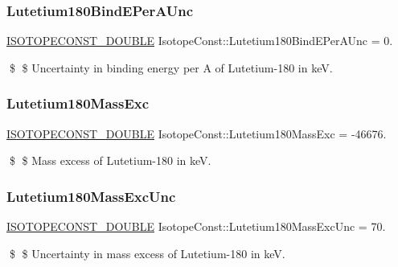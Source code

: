 \subsubsection{\texorpdfstring{Lutetium180\+Bind\+E\+Per\+A\+Unc}{Lutetium180BindEPerAUnc}}
{\footnotesize\ttfamily \mbox{\hyperlink{group___isotope_const-_macros_ga8f45a7272ce02c0b4c65c44636ed719a}{I\+S\+O\+T\+O\+P\+E\+C\+O\+N\+S\+T\+\_\+\+D\+O\+U\+B\+LE}} Isotope\+Const\+::\+Lutetium180\+Bind\+E\+Per\+A\+Unc = 0.}

\$ \$ Uncertainty in binding energy per A of Lutetium-\/180 in keV. \mbox{\label{group___isotope_const-_lutetium-_lu180_ga2206fd1afce32f40204fdcf497f7b20d}} 
\subsubsection{\texorpdfstring{Lutetium180\+Mass\+Exc}{Lutetium180MassExc}}
{\footnotesize\ttfamily \mbox{\hyperlink{group___isotope_const-_macros_ga8f45a7272ce02c0b4c65c44636ed719a}{I\+S\+O\+T\+O\+P\+E\+C\+O\+N\+S\+T\+\_\+\+D\+O\+U\+B\+LE}} Isotope\+Const\+::\+Lutetium180\+Mass\+Exc = -\/46676.}

\$ \$ Mass excess of Lutetium-\/180 in keV. \mbox{\label{group___isotope_const-_lutetium-_lu180_ga9c73573d6563356ae94ffabb70156c3b}} 
\subsubsection{\texorpdfstring{Lutetium180\+Mass\+Exc\+Unc}{Lutetium180MassExcUnc}}
{\footnotesize\ttfamily \mbox{\hyperlink{group___isotope_const-_macros_ga8f45a7272ce02c0b4c65c44636ed719a}{I\+S\+O\+T\+O\+P\+E\+C\+O\+N\+S\+T\+\_\+\+D\+O\+U\+B\+LE}} Isotope\+Const\+::\+Lutetium180\+Mass\+Exc\+Unc = 70.}

\$ \$ Uncertainty in mass excess of Lutetium-\/180 in keV. \mbox{\label{group___isotope_const-_lutetium-_lu180_ga770cce74e7aef268d718f84292bc8734}} 
